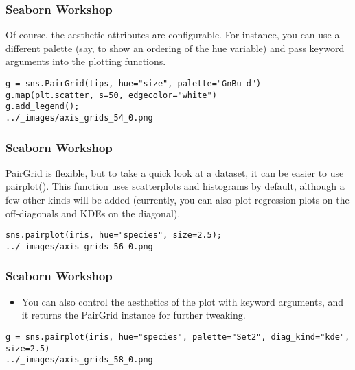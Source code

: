 \documentclass{beamer}
\begin{document}
\begin{frame}[fragile]
	\frametitle{Seaborn Workshop}
	\large
Of course, the aesthetic attributes are configurable. For instance, you can use a different palette (say, to show an ordering of the hue variable) and pass keyword arguments into the plotting functions.
\begin{verbatim}
g = sns.PairGrid(tips, hue="size", palette="GnBu_d")
g.map(plt.scatter, s=50, edgecolor="white")
g.add_legend();
../_images/axis_grids_54_0.png
\end{verbatim}
\end{frame}
\begin{frame}[fragile]
\frametitle{Seaborn Workshop}
\large

PairGrid is flexible, but to take a quick look at a dataset, it can be easier to use pairplot(). This function uses scatterplots and histograms by default, although a few other kinds will be added (currently, you can also plot regression plots on the off-diagonals and KDEs on the diagonal).
\begin{verbatim}
sns.pairplot(iris, hue="species", size=2.5);
../_images/axis_grids_56_0.png
\end{verbatim}

\end{frame}
\begin{frame}[fragile]
	\frametitle{Seaborn Workshop}
	\large
	\begin{itemize}
\item You can also control the aesthetics of the plot with keyword arguments, and it returns the PairGrid instance for further tweaking.

	\end{itemize}
\begin{verbatim}
g = sns.pairplot(iris, hue="species", palette="Set2", diag_kind="kde", size=2.5)
../_images/axis_grids_58_0.png
\end{verbatim}

\end{frame}
\end{document}
